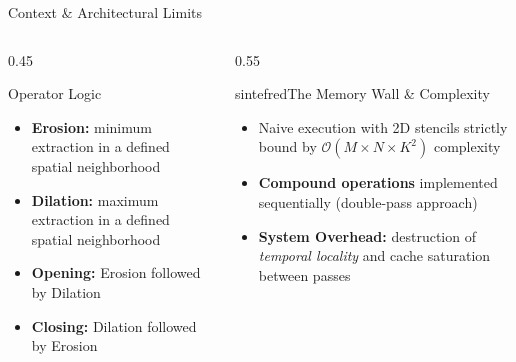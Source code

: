 \documentclass{beamer}
\begin{document}
\begin{frame}{Context \& Architectural Limits}
  \begin{columns}
    \begin{column}{0.45\textwidth}
      \begin{block}{Operator Logic}
        \begin{itemize}
          \item \textbf{Erosion:} minimum extraction in a defined spatial neighborhood
          \item \textbf{Dilation:} maximum extraction in a defined spatial neighborhood
          \item \textbf{Opening:} Erosion followed by Dilation
          \item \textbf{Closing:} Dilation followed by Erosion
        \end{itemize}
      \end{block}
    \end{column}
    \begin{column}{0.55\textwidth}
      \begin{colorblock}[white]{sintefred}{The Memory Wall \& Complexity}
        \begin{itemize}
          \item Naive execution with 2D stencils strictly bound by $\mathcal{O}(M \times N \times K^2)$ complexity
          \item \textbf{Compound operations} implemented sequentially (double-pass approach)
          \item \textbf{System Overhead:} destruction of \textit{temporal locality} and cache saturation between passes
        \end{itemize}
      \end{colorblock}
    \end{column}
  \end{columns}
\end{frame}
\end{document}
